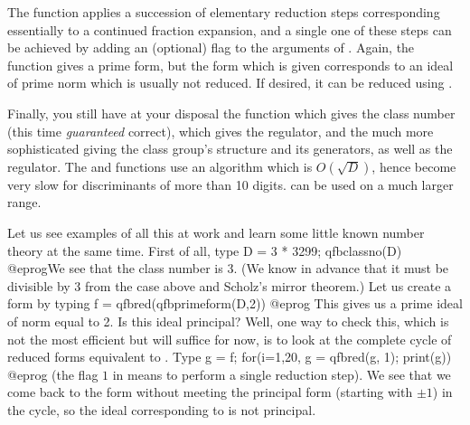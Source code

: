 The  function applies a succession of
elementary reduction steps corresponding essentially to a continued fraction
expansion, and a single one of these steps can be achieved by adding an
(optional) flag to the arguments of . Again, the function
 gives a prime form, but the form which is given
corresponds to an ideal of prime norm which is usually not reduced. If
desired, it can be reduced using .

Finally, you still have at your disposal the function  which
gives the class number (this time \emph{guaranteed} correct),
 which gives the regulator, and the much more sophisticated
 giving the class group's structure and its generators,
as well as the regulator. The  and 
functions use an algorithm which is $O(\sqrt D)$, hence become very slow for
discriminants of more than 10 digits.  can be used on a
much larger range.

Let us see examples of all this at work and learn some little known number
theory at the same time. First of all, type
\bprog
  D = 3 * 3299; qfbclassno(D)
@eprog\noindent We see that the class number is 3. (We know
in advance that it must be divisible by 3 from the  case above
and Scholz's mirror theorem.) Let us create a form by typing
\bprog
  f = qfbred(qfbprimeform(D,2))
@eprog\noindent
This gives us a prime ideal of norm equal to 2. Is this ideal principal?
Well, one way to check this, which is not the most efficient but will suffice
for now, is to look at the complete cycle of reduced forms equivalent to
. Type
\bprog
 g = f; for(i=1,20, g = qfbred(g, 1); print(g))
@eprog\noindent
(the flag $1$ in  means to perform a single reduction step). We
see that we come back to the form  without meeting the principal form
(starting with $\pm1$) in the cycle, so the ideal corresponding to  is
not principal.


